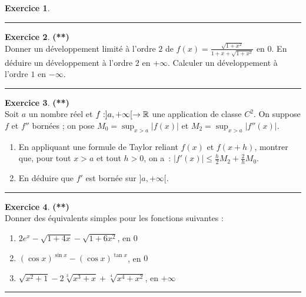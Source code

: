\documentclass[a4paper,11pt]{article}
\theoremstyle{definition}
\newtheorem{exo}{Exercice} %
\begin{document}
\begin{minipage}{1\linewidth}
\begin{minipage}[t]{0.48\linewidth}
\begin{exo}
			\centering
			\rule{1\linewidth}{0.6pt}
		\end{exo}
		
		
	\end{minipage}	
	\hfill\vrule\hfill
	\begin{minipage}[t]{0.48\linewidth}
		\raggedright
		
		\begin{exo}\textbf{(**)}\quad\\[0.2cm]
			Donner un développement limité à l'ordre $2$ de $f(x)=
			\displaystyle{\frac{\sqrt{1+x^2}}{1+x+\sqrt{1+x^2}}}$ en $0$.
			En déduire un développement à l'ordre $2$ en $+\infty$.
			Calculer un développement à l'ordre $1$ en $-\infty$.
			
			\centering
			\rule{1\linewidth}{0.6pt}
		\end{exo}
		
		
		
		\begin{exo}\textbf{(**)}\quad\\[0.2cm]
			Soit $a$ un nombre réel et $f : ] a , +\infty [ \rightarrow \mathbb{R}$ une application de classe $C^2$. 
			On suppose $f$ et $f''$ bornées ; on pose $\displaystyle  M_0=\sup _{x>a}\vert f(x)\vert$ et 
			$\displaystyle  M_2=\sup_{x> a}\vert f''(x)\vert$.
			\begin{enumerate}
				\item En appliquant une formule de Taylor reliant $f(x)$ et $f(x+h)$, montrer que, pour tout 
				$x>a$ et tout $h>0$, on a~: $\displaystyle \vert f'(x)\vert \leq \frac{h}{2}M_2+\frac{2}{h}M_0$.
				
				\item En déduire que $f'$ est bornée sur $]a,+\infty[$.
				
				
			\end{enumerate}
		
			\centering
			\rule{1\linewidth}{0.6pt}
		\end{exo}
		
		\begin{exo}\textbf{(**)}\quad\\[0.2cm]
			Donner des équivalents simples pour les fonctions suivantes :
			
			\begin{enumerate}
				\item $2e^x - \sqrt{1+4x} - \sqrt{1+6x^2}$,            en $0$      
				\item $(\cos x)^{\sin x} - (\cos x)^{\tan x}$,         en $0$      
				\item $\sqrt{x^2+1} -2\sqrt[3]{x^3+x} + \sqrt[4]{x^4+x^2}$,  en $+\infty$
   
			\end{enumerate}
			
			
			\centering
			\rule{1\linewidth}{0.6pt}
		\end{exo}
		

		
	
		
		
	\end{minipage}
\end{minipage}
\end{document}
